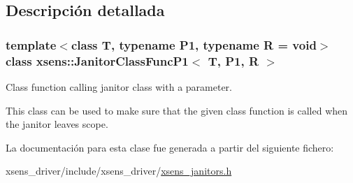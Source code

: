 \subsection{\-Descripción detallada}
\subsubsection*{template$<$class T, typename P1, typename R = void$>$class xsens\-::\-Janitor\-Class\-Func\-P1$<$ T, P1, R $>$}

\-Class function calling janitor class with a parameter. 

\-This class can be used to make sure that the given class function is called when the janitor leaves scope. 

\-La documentación para esta clase fue generada a partir del siguiente fichero\-:\begin{DoxyCompactItemize}
\item 
xsens\-\_\-driver/include/xsens\-\_\-driver/\hyperlink{xsens__janitors_8h}{xsens\-\_\-janitors.\-h}\end{DoxyCompactItemize}
